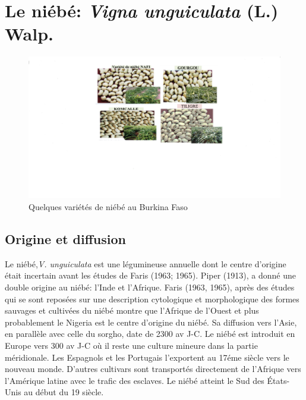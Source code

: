 \documentclass[a4paper,11pt]{article}
\begin{document}
\section{Le niébé: \emph{Vigna unguiculata} (L.) Walp.}
\begin{figure}%
  \begin{center}
   \includegraphics[width=12cm]{images/graines_niebe}
  \end{center}
\caption{Quelques variétés de niébé au Burkina Faso}
\end{figure}

\newpage



\subsection{Origine et diffusion}

Le niébé,\emph{V. unguiculata} est une légumineuse annuelle dont le centre
d’origine était incertain avant les études de Faris (1963;
1965). Piper (1913), a donné une double origine au niébé: l’Inde et
l’Afrique. Faris (1963, 1965), après des études qui se sont reposées
sur une description cytologique et morphologique des formes sauvages
et cultivées du niébé montre que l’Afrique de l’Ouest et plus
probablement le Nigeria est le centre d’origine du niébé. Sa diffusion
vers l’Asie, en parallèle avec celle du sorgho, date de 2300 av
J-C. Le niébé est introduit en Europe vers 300 av J-C où il reste une
culture mineure dans la partie méridionale. Les Espagnols et les
Portugais l’exportent au 17éme siècle vers le nouveau monde. D’autres
cultivars sont transportés directement de l’Afrique vers l’Amérique
latine avec le trafic des esclaves. Le niébé atteint le Sud des
États-Unis au début du 19\ieme{} siècle\cite{Sawadogo_2009}.
\end{document}
